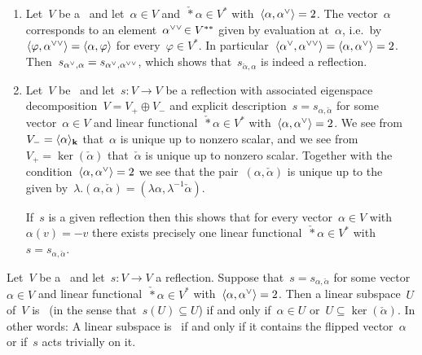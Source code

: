 \begin{remark}
  \label{regarding general reflections}
  \leavevmode
  \begin{enumerate}
    \item
      Let~$V$ be a~{\vectorspace{$\kf$}} and let~$\alpha \in V$ and~$\check*{\alpha} \in V^*$ with~$\pair{\alpha, \check{\alpha}} = 2$.
      The vector~$\alpha$ corresponds to an element~$\dcheck*{\alpha} \in V^{**}$ given by evaluation at~$\alpha$, i.e.\ by~$\pair{\varphi, \dcheck{\alpha}} = \pair{\alpha, \varphi}$ for every~$\varphi \in V^*$.
      In particular~$\pair{\check{\alpha}, \dcheck{\alpha}} = \pair{\alpha, \check{\alpha}} = 2$.
      Then~$s_{\check{\alpha}, \alpha} = s_{\check{\alpha}, \dcheck{\alpha}}$, which shows that~$s_{\check{\alpha}, \alpha}$ is indeed a reflection.
    \item
      \label{uniqueness of reflection parametrization}
      Let~$V$ be~{\vectorspace{$\kf$}} and let~$s \colon V \to V$ be a reflection with associated eigenspace decomposition~$V = V_+ \oplus V_-$ and explicit description~$s = s_{\alpha, \check{\alpha}}$ for some vector~$\alpha \in V$ and linear functional~$\check*{\alpha} \in V^*$ with~$\pair{\alpha, \check{\alpha}} = 2$.
      We see from~$V_- = \langle\alpha\rangle_{\mathbf{k}}$ that~$\alpha$ is unique up to nonzero scalar, and we see from~$V_+ = \ker(\check{\alpha})$ that~$\check{\alpha}$ is unique up to nonzero scalar.
      Together with the condition~$\pair{\alpha, \check{\alpha}} = 2$ we see that the pair~$(\alpha, \check{\alpha})$ is unique up to the~{\action{$\kf^{\times}$}} given by~$\lambda.(\alpha, \check{\alpha}) = (\lambda \alpha, \lambda^{-1} \check{\alpha})$.
      
      If~$s$ is a given reflection then this shows that for every vector~$\alpha \in V$ with~$\alpha(v) = -v$ there exists precisely one linear functional~$\check*{\alpha} \in V^*$ with~$s = s_{\alpha, \check{\alpha}}$.
  \end{enumerate}
\end{remark}


\begin{lemma}
  \label{subspaces invariant under reflection}
  Let~$V$ be a~{\vectorspace{$\kf$}} and let~$s \colon V \to V$ a reflection.
  Suppose that~$s = s_{\alpha, \check{\alpha}}$ for some vector~$\alpha \in V$ and linear functional~$\check*{\alpha} \in V^*$ with~$\pair{\alpha, \check{\alpha}} = 2$.
  Then a linear subspace~$U$ of~$V$ is~{} (in the sense that~$s(U) \subseteq U$) if and only if~$\alpha \in U$ or~$U \subseteq \ker(\check{\alpha})$.
  In other words:
  A linear subspace is~{} if and only if it contains the flipped vector~$\alpha$ or if~$s$ acts trivially on it.
\end{lemma}


